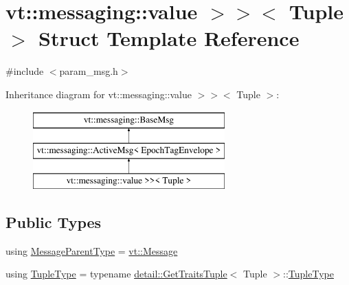 \hypertarget{structvt_1_1messaging_1_1_param_msg_3_01_tuple_00_01std_1_1enable__if__t_3_01not_01is__byte__copae27aaaf2bf1aaed1864cee3aebbc774}{}\section{vt\+:\+:messaging\+:\+:value $>$$>$$<$ Tuple $>$ Struct Template Reference}
\label{structvt_1_1messaging_1_1_param_msg_3_01_tuple_00_01std_1_1enable__if__t_3_01not_01is__byte__copae27aaaf2bf1aaed1864cee3aebbc774}


{\ttfamily \#include $<$param\+\_\+msg.\+h$>$}

Inheritance diagram for vt\+:\+:messaging\+:\+:value $>$$>$$<$ Tuple $>$\+:\begin{figure}[H]
\begin{center}
\leavevmode
\includegraphics[height=3.000000cm]{structvt_1_1messaging_1_1_param_msg_3_01_tuple_00_01std_1_1enable__if__t_3_01not_01is__byte__copae27aaaf2bf1aaed1864cee3aebbc774}
\end{center}
\end{figure}
\subsection*{Public Types}
\begin{DoxyCompactItemize}
\item 
using \hyperlink{structvt_1_1messaging_1_1_param_msg_3_01_tuple_00_01std_1_1enable__if__t_3_01not_01is__byte__copae27aaaf2bf1aaed1864cee3aebbc774_a1df6cf9b9df170d14173533ead85534d}{Message\+Parent\+Type} = \hyperlink{namespacevt_a3a3ddfef40b4c90915fa43cdd5f129ea}{vt\+::\+Message}
\item 
using \hyperlink{structvt_1_1messaging_1_1_param_msg_3_01_tuple_00_01std_1_1enable__if__t_3_01not_01is__byte__copae27aaaf2bf1aaed1864cee3aebbc774_a63c0c672da0bf7b284da9647aad497f8}{Tuple\+Type} = typename \hyperlink{structvt_1_1messaging_1_1detail_1_1_get_traits_tuple}{detail\+::\+Get\+Traits\+Tuple}$<$ Tuple $>$\+::\hyperlink{structvt_1_1messaging_1_1_param_msg_3_01_tuple_00_01std_1_1enable__if__t_3_01not_01is__byte__copae27aaaf2bf1aaed1864cee3aebbc774_a63c0c672da0bf7b284da9647aad497f8}{Tuple\+Type}
\end{DoxyCompactItemize}

